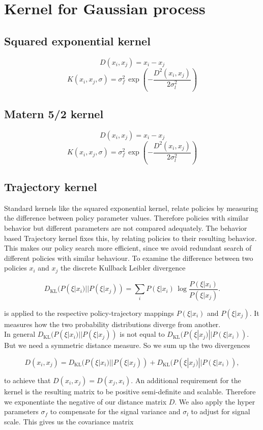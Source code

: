 \section{Kernel for Gaussian process}
\subsection{Squared exponential kernel}
$$D(x_i,x_j) = x_i-x_j$$
$$K(x_i,x_j,\sigma) = \sigma_{f}^{2}\,\exp\left(-\frac{D^2(x_i,x_j)}{2\sigma_l^2} \right) $$
\subsection{Matern 5/2 kernel}
$$D(x_i,x_j) = x_i-x_j$$
$$K(x_i,x_j,\sigma) = \sigma_{f}^{2}\,\exp\left(-\frac{D^2(x_i,x_j)}{2\sigma_l^2} \right) $$
\subsection{Trajectory kernel}
Standard kernels like the squared exponential kernel, relate policies by measuring the difference between policy parameter values. Therefore policies with similar behavior but different parameters are not compared adequately. The behavior based Trajectory kernel fixes this, by relating policies to their resulting behavior. This makes our policy search more efficient, since we avoid redundant search of different policies with similar behaviour. To examine the difference between two policies $x_{ i }$ and $x_{ j }$ the discrete Kullback Leibler divergence

$$D_{\mathrm {KL} }(P(\xi|x_{ i })||P(\xi|x_{ j })) = \sum _{i}P(\xi|x_{ i })\,\log {\frac {P(\xi|x_{ i })}{P(\xi|x_{ j })}}.$$

is applied to the respective policy-trajectory mappings $P(\xi|x_{ i })$ and $P(\xi|x_{ j })$. It measures how the two probability distributions diverge from another.\\

In general $D_{\mathrm {KL} }(P(\xi|x_{ i })||P(\xi|x_{ j }))$ is not equal to $D_{\mathrm {KL} }(P(\xi|x_{ j })||P(\xi|x_{ i }))$. But we need a symmetric distance measure. So we sum up the two divergences

$$D(x_{ i }, x_{ j }) = D_{\mathrm {KL} }(P(\xi|x_{ i })||P(\xi|x_{ j })) + D_{\mathrm {KL} }(P(\xi|x_{ j })||P(\xi|x_{ i })),$$

to achieve that $D(x_{ i }, x_{ j }) = D(x_{ j }, x_{ i })$. An additional requirement for the kernel is the resulting matrix to be positive semi-definite and scalable\cite{wilson2014using}. Therefore we exponentiate the negative of our distance matrix $D$. We also apply the hyper parameters $\sigma_f$ to compensate for the signal variance and $\sigma_l$ to adjust for signal scale. This gives us the covariance matrix

